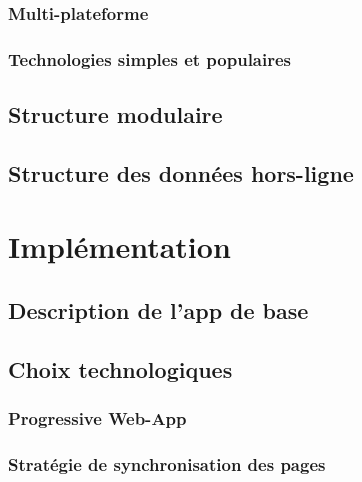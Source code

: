 \documentclass{EPL-master-thesis-covers-FR}
\begin{document}
			\subsection*{Multi-plateforme}
				

			\subsection*{Technologies simples et populaires}


		\section{Structure modulaire}
			\label{sec:modules}


			

		\section{Structure des données hors-ligne}
			\label{sec:data}


	\chapter{Implémentation}

		\section{Description de l'app de base}
		
		\section{Choix technologiques}
			\label{sec:choix_tech}
			
			\subsection*{Progressive Web-App}
				
			\subsection{Stratégie de synchronisation des pages}			
			
\end{document}
